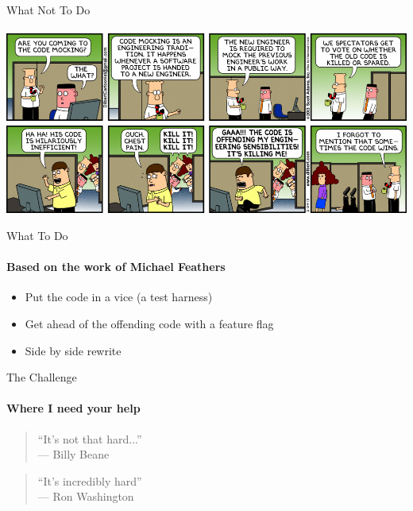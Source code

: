\documentclass[bigger]{beamer}
\begin{document}
\begin{frame}{What Not To Do}
  \framesubtitle{}
  \includegraphics[width=\textwidth]{images/code-mocking.png}
\end{frame}

\begin{frame}{What To Do}
  \framesubtitle{Based on the work of Michael Feathers}
  \begin{itemize}
    \item Put the code in a vice (a test harness)
    \item Get ahead of the offending code with a feature flag
    \item Side by side rewrite
  \end{itemize}
  \note{
    }
  \end{frame}

  \begin{frame}{The Challenge}
    \framesubtitle{Where I need your help}
    \begin{quote}
      ``It's not that hard...''\\
      \hfill --- Billy Beane
    \end{quote}
    \bigskip
    \begin{quote}
      ``It's incredibly hard''\\
      \hfill --- Ron Washington
    \end{quote}
    \bigskip
  \end{frame}
\end{document}
